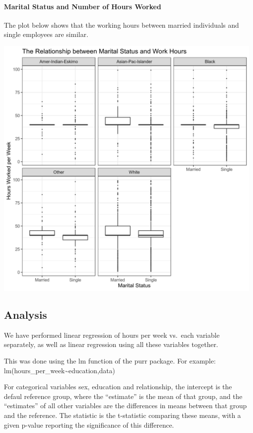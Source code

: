\documentclass[]{article}
\let\oldparagraph\paragraph
\renewcommand{\paragraph}[1]{\oldparagraph{#1}\mbox{}}
\begin{document}
\hypertarget{marital-status-and-number-of-hours-worked}{%
\paragraph{Marital Status and Number of Hours
Worked}\label{marital-status-and-number-of-hours-worked}}

The plot below shows that the working hours between married individuals
and single employees are similar.

\includegraphics{../images/Plot_4_Marital_Status_and_Work_Hours.png}

\hypertarget{analysis}{%
\subsection{Analysis}\label{analysis}}

We have performed linear regression of hours per week vs.~each variable
separately, as well as linear regression using all these variables
together.

This was done using the lm function of the purr package. For example:
lm(hours\_per\_week\textasciitilde{}education,data)

For categorical variables sex, education and relationship, the intercept
is the defaul reference group, where the ``estimate'' is the mean of
that group, and the ``estimates'' of all other variables are the
differences in means between that group and the reference. The statistic
is the t-statistic comparing these means, with a given p-value reporting
the significance of this difference.
\end{document}
